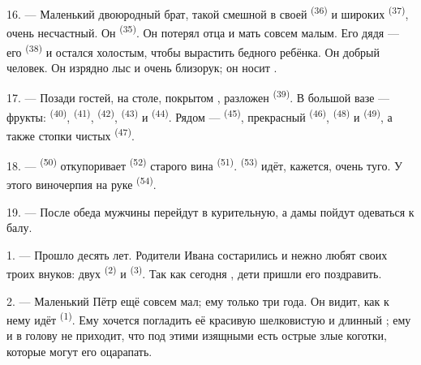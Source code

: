 16. --- Маленький двоюродный брат, такой смешной в своей 
\textsuperscript{(36)} и широких  \textsuperscript{(37)}, очень
несчастный. Он  \textsuperscript{(35)}. Он потерял отца и
мать совсем малым. Его дядя --- его  \textsuperscript{(38)} и
остался холостым, чтобы вырастить бедного ребёнка. Он добрый человек. Он
изрядно лыс и очень близорук; он носит .

\VUsaut{2.4mm}
\VUsaut{3.0mm}

17. --- Позади гостей, на столе, покрытом , разложен
 \textsuperscript{(39)}. В большой вазе --- фрукты:
 \textsuperscript{(40)},  \textsuperscript{(41)},
 \textsuperscript{(42)},  \textsuperscript{(43)} и
 \textsuperscript{(44)}. Рядом --- 
\textsuperscript{(45)}, прекрасный  \textsuperscript{(46)},
 \textsuperscript{(48)} и 
\textsuperscript{(49)}, а также стопки чистых  \textsuperscript{(47)}.

18. ---  \textsuperscript{(50)} откупоривает 
\textsuperscript{(52)} старого вина  \textsuperscript{(51)}.
 \textsuperscript{(53)} идёт, кажется, очень туго. У этого
виночерпия на руке  \textsuperscript{(54)}.

19. --- После обеда мужчины перейдут в курительную, а дамы пойдут
одеваться к балу.

\VUsaut{5.0mm}
\VUsaut{1.6mm}
\VUsaut{2.6mm}

\VUsaut{3.0mm}

1. --- Прошло десять лет. Родители Ивана состарились и нежно любят своих
троих внуков: двух  \textsuperscript{(2)} и 
\textsuperscript{(3)}. Так как сегодня , дети пришли
его поздравить.

2. --- Маленький Пётр ещё совсем мал; ему только три года. Он видит, как
к нему идёт  \textsuperscript{(1)}. Ему хочется погладить её
красивую шелковистую  и длинный ; ему и в
голову не приходит, что под этими изящными  есть острые
злые коготки, которые могут его оцарапать.

